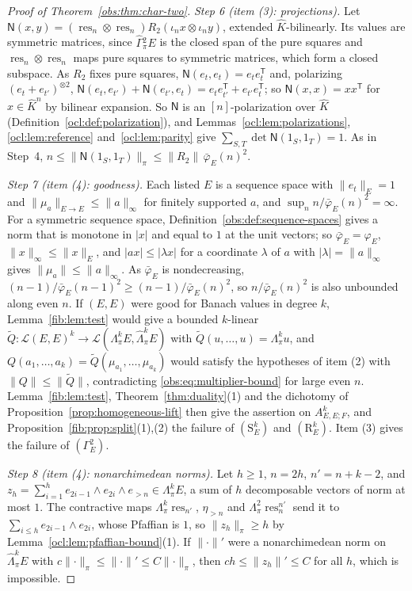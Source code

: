 \documentclass[11pt]{amsart}
\theoremstyle{definition}
\theoremstyle{remark}
\numberwithin{equation}{section}
\newcommand{\cL}{\mathcal L}
\newcommand{\abs}[1]{\lvert #1\rvert}
\newcommand{\norm}[1]{\lVert #1\rVert}
\theoremstyle{plain}
\theoremstyle{definition}
\theoremstyle{plain}
\begin{document}
\begin{proof}[Proof of Theorem~\ref{obs:thm:char-two}]
\emph{Step 6 (item (3): projections).} Let $\mathsf N(x,y)=(\operatorname{res}_n\otimes\operatorname{res}_n)
R_2(\iota_nx\otimes\iota_ny)$, extended $\widehat K$-bilinearly. Its values are symmetric matrices, since
$\widehat\Gamma{}^2_\pi E$ is the closed span of the pure squares and $\operatorname{res}_n\otimes\operatorname{res}_n$
maps pure squares to symmetric matrices, which form a closed subspace. As $R_2$ fixes pure squares,
$\mathsf N(e_t,e_t)=e_te_t^{\mathsf T}$ and, polarizing $(e_t+e_{t'})^{\otimes2}$,
$\mathsf N(e_t,e_{t'})+\mathsf N(e_{t'},e_t)=e_te_{t'}^{\mathsf T}+e_{t'}e_t^{\mathsf T}$; so
$\mathsf N(x,x)=xx^{\mathsf T}$ for $x\in\widehat K^n$ by bilinear expansion. So $\mathsf N$ is an $[n]$-polarization
over $\widehat K$ (Definition~\ref{ocl:def:polarization}), and Lemmas~\ref{ocl:lem:polarizations}, \ref{ocl:lem:reference} and~\ref{ocl:lem:parity} give $\sum_{S,T}\det\mathsf N(1_S,1_T)=1$. As in Step~4,
$n\le\norm{\mathsf N(1_S,1_T)}_\pi\le\norm{R_2}\,\bar\varphi_E(n)^2$.

\emph{Step 7 (item (4): goodness).} Each listed $E$ is a sequence space with $\norm{e_t}_E=1$ and
$\norm{\mu_a}_{E\to E}\le\norm a_\infty$ for finitely supported $a$, and $\sup_nn/\bar\varphi_E(n)^2=\infty$. For a
symmetric sequence space, Definition~\ref{obs:def:sequence-spaces} gives a norm that is monotone in $\abs x$ and equal
to $1$ at the unit vectors; so $\bar\varphi_E=\varphi_E$, $\norm x_\infty\le\norm x_E$, and $\abs{ax}\le\abs{\lambda x}$
for a coordinate $\lambda$ of $a$ with $\abs\lambda=\norm a_\infty$ gives $\norm{\mu_a}\le\norm a_\infty$. As
$\bar\varphi_E$ is nondecreasing, $(n-1)/\bar\varphi_E(n-1)^2\ge(n-1)/\bar\varphi_E(n)^2$, so $n/\bar\varphi_E(n)^2$ is
also unbounded along even $n$. If $(E,E)$ were good for Banach values in degree $k$, Lemma~\ref{fib:lem:test} would give
a bounded $k$-linear $\widetilde Q\colon\cL(E,E)^k\to\cL(\Lambda^k_\pi E,\widehat\Lambda^k_\pi E)$ with
$\widetilde Q(u,\dots,u)=\Lambda^k_\pi u$, and $Q(a_1,\dots,a_k)=\widetilde Q(\mu_{a_1},\dots,\mu_{a_k})$ would satisfy
the hypotheses of item (2) with $\norm Q\le\norm{\widetilde Q}$, contradicting \eqref{obs:eq:multiplier-bound} for large
even $n$. Lemma~\ref{fib:lem:test}, Theorem~\ref{thm:duality}(1) and the dichotomy of Proposition~\ref{prop:homogeneous-lift} then give the assertion on $A^k_{E,E;F}$, and
Proposition~\ref{fib:prop:split}(1),(2) the failure of $(\mathrm S^k_E)$ and $(\mathrm R^k_E)$. Item (3) gives the failure of
$(\Gamma^2_E)$.

\emph{Step 8 (item (4): nonarchimedean norms).} Let $h\ge1$, $n=2h$, $n'=n+k-2$, and
$z_h=\sum_{i=1}^he_{2i-1}\wedge e_{2i}\wedge e_{>n}\in\Lambda^k_\pi E$, a sum of $h$ decomposable vectors of norm at
most $1$.
The contractive maps $\Lambda^k_\pi\operatorname{res}_{n'}$, $\eta_{>n}$ and $\Lambda^2_\pi\operatorname{res}^{n'}_n$ send
it to $\sum_{i\le h}e_{2i-1}\wedge e_{2i}$, whose Pfaffian is $1$, so $\norm{z_h}_\pi\ge h$ by
Lemma~\ref{ocl:lem:pfaffian-bound}(1). If $\norm\cdot'$ were a nonarchimedean norm on $\widehat\Lambda^k_\pi E$ with
$c\norm\cdot_\pi\le\norm\cdot'\le C\norm\cdot_\pi$, then $ch\le\norm{z_h}'\le C$ for all $h$, which is impossible.


\end{proof}
\end{document}

